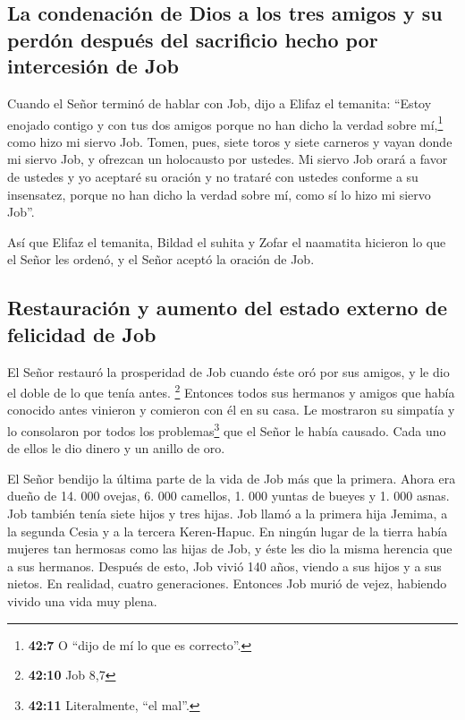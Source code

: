 \hypertarget{la-condenaciuxf3n-de-dios-a-los-tres-amigos-y-su-perduxf3n-despuuxe9s-del-sacrificio-hecho-por-intercesiuxf3n-de-job}{%
\subsection{La condenación de Dios a los tres amigos y su perdón después
del sacrificio hecho por intercesión de
Job}\label{la-condenaciuxf3n-de-dios-a-los-tres-amigos-y-su-perduxf3n-despuuxe9s-del-sacrificio-hecho-por-intercesiuxf3n-de-job}}

 Cuando el Señor terminó de hablar con Job, dijo a Elifaz
el temanita: ``Estoy enojado contigo y con tus dos amigos porque no han
dicho la verdad sobre mí,\footnote{\textbf{42:7} O ``dijo de mí lo que
  es correcto''.} como hizo mi siervo Job.  Tomen, pues,
siete toros y siete carneros y vayan donde mi siervo Job, y ofrezcan un
holocausto por ustedes. Mi siervo Job orará a favor de ustedes y yo
aceptaré su oración y no trataré con ustedes conforme a su insensatez,
porque no han dicho la verdad sobre mí, como sí lo hizo mi siervo Job''.

 Así que Elifaz el temanita, Bildad el suhita y Zofar el
naamatita hicieron lo que el Señor les ordenó, y el Señor aceptó la
oración de Job.

\hypertarget{restauraciuxf3n-y-aumento-del-estado-externo-de-felicidad-de-job}{%
\subsection{Restauración y aumento del estado externo de felicidad de
Job}\label{restauraciuxf3n-y-aumento-del-estado-externo-de-felicidad-de-job}}

 El Señor restauró la prosperidad de Job cuando éste oró
por sus amigos, y le dio el doble de lo que tenía antes. \footnote{\textbf{42:10}
  Job 8,7}  Entonces todos sus hermanos y amigos que
había conocido antes vinieron y comieron con él en su casa. Le mostraron
su simpatía y lo consolaron por todos los problemas\footnote{\textbf{42:11}
  Literalmente, ``el mal''.} que el Señor le había causado. Cada uno de
ellos le dio dinero y un anillo de oro.

 El Señor bendijo la última parte de la vida de Job más
que la primera. Ahora era dueño de 14. 000 ovejas, 6. 000 camellos, 1.
000 yuntas de bueyes y 1. 000 asnas.  Job también tenía
siete hijos y tres hijas.  Job llamó a la primera hija
Jemima, a la segunda Cesia y a la tercera Keren-Hapuc. 
En ningún lugar de la tierra había mujeres tan hermosas como las hijas
de Job, y éste les dio la misma herencia que a sus hermanos.
 Después de esto, Job vivió 140 años, viendo a sus hijos
y a sus nietos. En realidad, cuatro generaciones. 
Entonces Job murió de vejez, habiendo vivido una vida muy plena.
